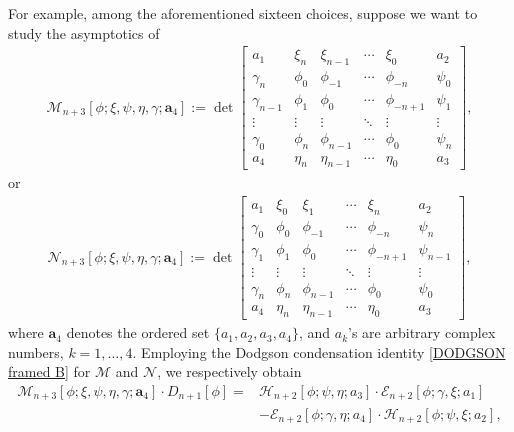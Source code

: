 \documentclass[pdftex]{sigma}
\numberwithin{equation}{section}
\newcommand{\ga}{\gamma}
\begin{document}
For example, among the aforementioned sixteen choices, suppose we want to study the asymptotics of
		\begin{gather*}%
			\mathscr{M}_{n+3}[\phi; \xi, \psi, \eta, \ga; \boldsymbol{a}_4] := \det \begin{bmatrix}
				a_1 & \xi_{n} & \xi_{n-1} & \cdots & \xi_{0} & a_2 \\
				\ga_{n} &	\phi_0& \phi_{-1} & \cdots & \phi_{-n} & \psi_{0} \\
				\ga_{n-1} &	\phi_{1}& \phi_0 & \cdots & \phi_{-n+1} & \psi_{1} \\
				\vdots &	\vdots & \vdots & \ddots & \vdots & \vdots \\
				\ga_0 &	\phi_{n} & \phi_{n-1} & \cdots & \phi_{0} & \psi_{n} \\
				a_4 &	\eta_{n} & \eta_{n-1} & \cdots & \eta_{0} & a_3
			\end{bmatrix},
		\end{gather*}
		or
		\begin{gather*}
			\mathscr{N}_{n+3}[\phi; \xi, \psi, \eta, \ga; \boldsymbol{a}_4] := \det \begin{bmatrix}
				a_1 & \xi_{0} & \xi_{1} & \cdots & \xi_{n} & a_2 \\
				\ga_{0} &	\phi_0& \phi_{-1} & \cdots & \phi_{-n} & \psi_{n} \\
				\ga_{1} &	\phi_{1}& \phi_0 & \cdots & \phi_{-n+1} & \psi_{n-1} \\
				\vdots &	\vdots & \vdots & \ddots & \vdots & \vdots \\
				\ga_n &	\phi_{n} & \phi_{n-1} & \cdots & \phi_{0} & \psi_{0} \\
				a_4 &	\eta_{n} & \eta_{n-1} & \cdots & \eta_{0} & a_3
			\end{bmatrix},
		\end{gather*}
		where $\boldsymbol{a}_4$ denotes the ordered set $\{a_1, a_2, a_3, a_4\}$, and $a_k$'s are arbitrary complex numbers, ${k=1,\dots,4}$. Employing the Dodgson condensation identity \eqref{DODGSON framed B} for $\mathscr{M}$ and $\mathscr{N}$, we respectively obtain
		\begin{align}
			\mathscr{M}_{n+3}[\phi; \xi, \psi, \eta, \ga; \boldsymbol{a}_4] \cdot D_{n+1}[\phi] ={}& \mathscr{H}_{n+2}[\phi;\psi,\eta;a_3] \cdot \mathscr{E}_{n+2}[\phi;\ga,\xi;a_1]\nonumber \\
 &- \mathscr{E}_{n+2}[\phi;\ga,\eta;a_4] \cdot \mathscr{H}_{n+2}[\phi;\psi,\xi;a_2], 	\label{M in terms of semi-framed stuff}
		\end{align}
\end{document}
